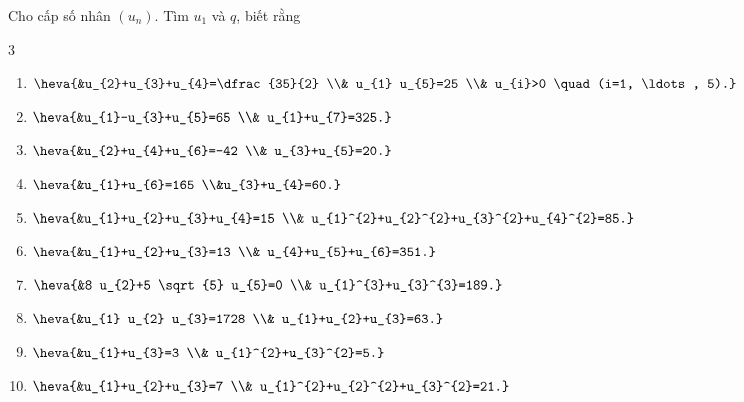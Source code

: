 \begin{vd}%
	Cho cấp số nhân $\left(u_{n}\right)$. Tìm $u_{1}$ và $ q $, biết rằng
	\begin{multicols}{3}
		\begin{enumerate}
			\item $ \heva{&u_{2}+u_{3}+u_{4}=\dfrac{35}{2} \\& u_{1} u_{5}=25 \\& u_{i}>0 \quad (i=1, \ldots, 5).} $
			\item $ \heva{&u_{1}-u_{3}+u_{5}=65 \\& u_{1}+u_{7}=325.} $
			\item $ \heva{&u_{2}+u_{4}+u_{6}=-42 \\& u_{3}+u_{5}=20.} $
			\item $\heva{&u_{1}+u_{6}=165 \\&u_{3}+u_{4}=60.}$
			\item $ \heva{&u_{1}+u_{2}+u_{3}+u_{4}=15 \\& u_{1}^{2}+u_{2}^{2}+u_{3}^{2}+u_{4}^{2}=85.} $
			\item $ \heva{&u_{1}+u_{2}+u_{3}=13 \\& u_{4}+u_{5}+u_{6}=351.} $
			\item $ \heva{&8 u_{2}+5 \sqrt{5} u_{5}=0 \\& u_{1}^{3}+u_{3}^{3}=189.} $
			\item $ \heva{&u_{1} u_{2} u_{3}=1728 \\& u_{1}+u_{2}+u_{3}=63.} $
			\item $ \heva{&u_{1}+u_{3}=3 \\& u_{1}^{2}+u_{3}^{2}=5.} $
			\item $ \heva{&u_{1}+u_{2}+u_{3}=7 \\& u_{1}^{2}+u_{2}^{2}+u_{3}^{2}=21.} $
		\end{enumerate}
	\end{multicols}
\end{vd}
